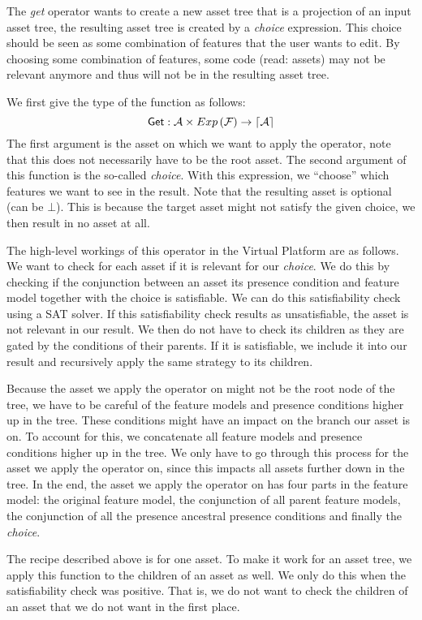 The \emph{get} operator wants to create a new asset tree that is a projection
of an input asset tree, the resulting asset tree is created by a \emph{choice}
expression. This choice should be seen as some combination of features that
the user wants to edit. By choosing some combination of features, some code
(read: assets) may not be relevant anymore and thus will not be in the
resulting asset tree. 

We first give the type of the function as follows:
\[
  {\sf Get} : \mathcal{A} \times Exp \left( \mathcal{F} \right) \rightarrow \lceil \mathcal{A} \rceil
\]
The first argument is the asset on which we want to apply the operator, note
that this does not necessarily have to be the root asset. The second argument
of this function is the so-called \emph{choice}. With this expression, we
``choose'' which features we want to see in the result. Note that the resulting
asset is optional (can be \(\bot\)). This is because the target asset might not
satisfy the given choice, we then result in no asset at all.

The high-level workings of this operator in the Virtual Platform are as
follows. We want to check for each asset if it is relevant for our
\emph{choice}. We do this by checking if the conjunction between an asset its
presence condition and feature model together with the choice is satisfiable.
We can do this satisfiability check using a SAT solver. If this satisfiability
check results as unsatisfiable, the asset is not relevant in our result. We
then do not have to check its children as they are gated by the conditions of
their parents. If it is satisfiable, we include it into our result and 
recursively apply the same strategy to its children. 

Because the asset we apply the operator on might not be the root node of the
tree, we have to be careful of the feature models and presence conditions higher
up in the tree. These conditions might have an impact on the branch our asset is 
on. To account for this, we concatenate all feature models and presence
conditions higher up in the tree. We only have to go through this process for
the asset we apply the operator on, since this impacts all assets further down
in the tree. In the end, the asset we apply the operator on has four parts in
the feature model: the original feature model, the conjunction of all parent
feature models, the conjunction of all the presence ancestral presence
conditions and finally the \emph{choice}.

The recipe described above is for one asset. To make it work for an asset tree,
we apply this function to the children of an asset as well. We only do this
when the satisfiability check was positive. That is, we do not want to check
the children of an asset that we do not want in the first place.

